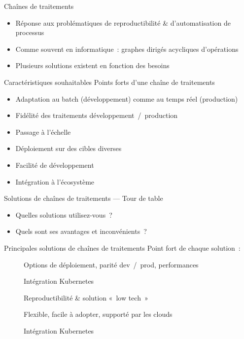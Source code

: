 \begin{frame}{Chaînes de traitements}
  \begin{itemize}
    \item Réponse aux problématiques de reproductibilité \& d'automatisation de processus
    \item Comme souvent en informatique~: graphes dirigés acycliques d'opérations
    \item Plusieurs solutions existent en fonction des besoins
  \end{itemize}
\end{frame}

\begin{frame}{Caractéristiques souhaitables}
  Points forts d'une chaîne de traitements
  \begin{itemize}
    \item Adaptation au batch (développement) comme au temps réel (production)
    \item Fidélité des traitements développement~/~production
    \item Passage à l'échelle
    \item Déploiement sur des cibles diverses
    \item Facilité de développement
    \item Intégration à l'écosystème
  \end{itemize}
\end{frame}

\begin{frame}{Solutions de chaînes de traitements — Tour de table}
  \begin{itemize}
    \item Quelles solutions utilisez-vous~?
    \item Quels sont ses avantages et inconvénients~?
  \end{itemize}
\end{frame}

\begin{frame}{Principales solutions de chaînes de traitements}
  Point fort de chaque solution~:

  \begin{description}
    \item[] Options de déploiement, parité dev~/~prod, performances
    \item[] Intégration Kubernetes
    \item[] Reproductibilité \& solution «~low tech~»
    \item[] Flexible, facile à adopter, supporté par les clouds
    \item[] Intégration Kubernetes
  \end{description}
\end{frame}
